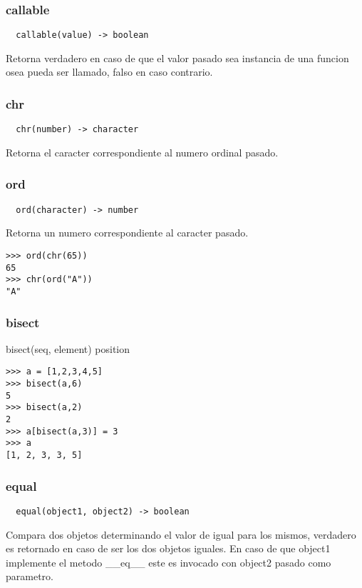 \subsubsection*{callable}
\begin{verbatim}
  callable(value) -> boolean
\end{verbatim}
Retorna verdadero en caso de que el valor pasado sea instancia de una funcion
osea pueda ser llamado, falso en caso contrario.

\subsubsection*{chr}
\begin{verbatim}
  chr(number) -> character
\end{verbatim}
Retorna el caracter correspondiente al numero ordinal pasado.

\subsubsection*{ord}
\begin{verbatim}
  ord(character) -> number
\end{verbatim}
Retorna un numero correspondiente al caracter pasado.
\begin{lstlisting}[style=consola]
>>> ord(chr(65))
65
>>> chr(ord("A"))
"A"
\end{lstlisting}

\subsubsection*{bisect}
bisect(seq, element) \rightarrow position
\begin{lstlisting}[style=consola]
>>> a = [1,2,3,4,5]
>>> bisect(a,6)
5
>>> bisect(a,2)
2
>>> a[bisect(a,3)] = 3
>>> a
[1, 2, 3, 3, 5]
\end{lstlisting}

\subsubsection*{equal}
\begin{verbatim}
  equal(object1, object2) -> boolean
\end{verbatim}
Compara dos objetos determinando el valor de igual para los mismos, verdadero es
retornado en caso de ser los dos objetos iguales.
En caso de que object1 implemente el metodo __eq__ este es invocado con object2
pasado como parametro.

